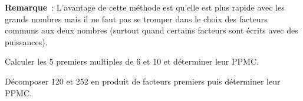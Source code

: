 \begin{methode*1}
\textcolor{H1}{\textbf{Remarque}} :
L'avantage de cette méthode est qu'elle est plus rapide avec les grands nombres mais il ne faut pas se tromper dans le choix des facteurs communs aux deux nombres (surtout quand certains facteurs sont écrits avec des puissances).

 

 \exercice
Calculer les 5 premiers multiples de 6 et 10 et déterminer leur PPMC.
 
\vspace{5em}


 \exercice
Décomposer 120 et 252 en produit de facteurs premiers puis déterminer leur PPMC.

\vspace{5em}


 \end{methode*1}
 

